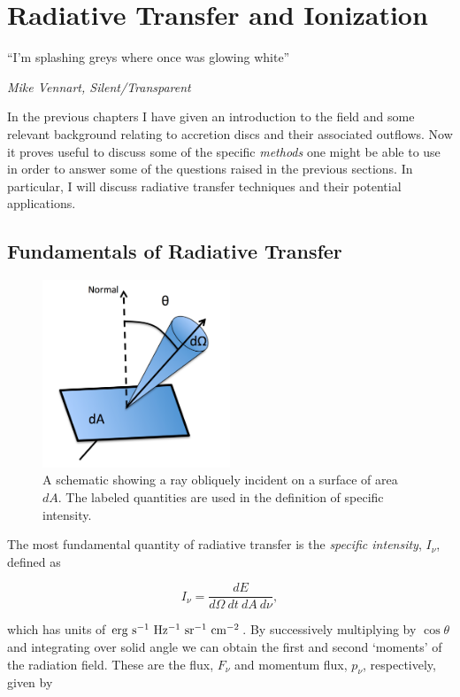 \chapter{Radiative Transfer and Ionization}

\epigraph{``I'm splashing greys where once was glowing white''}{{\sl Mike Vennart, Silent/Transparent}}

In the previous chapters I have given an introduction to the field and 
some relevant background relating to accretion 
discs and their associated outflows. Now it proves useful
to discuss some of the specific {\em methods} one might be able to use
in order to answer some of the questions raised in the previous sections.
In particular, I will discuss radiative transfer techniques and 
their potential applications.

\section{Fundamentals of Radiative Transfer}

\begin{figure}
\centering
\includegraphics[width=0.5\textwidth]{figures/03-radtrans/rays_schematic.png}
\caption
{
A schematic showing a ray obliquely incident on a surface of area $dA$.
The labeled quantities are used in the definition of specific intensity.
} 
\label{fig:ray}
\end{figure}


The most fundamental quantity of radiative transfer is the 
{\em specific intensity}, $I_\nu$, defined as

\begin{equation}
I_\nu = \frac{dE}{d\Omega~dt~dA~d\nu},
\end{equation}

which has units of ${\rm erg~s^{-1}~Hz^{-1}~sr^{-1}~cm^{-2}}$.
By successively multiplying by $\cos \theta$ and integrating over solid angle we 
can obtain the first and second `moments' of the radiation field. These
are the flux, $F_\nu$ and momentum flux, $p_\nu$, respectively, given by

